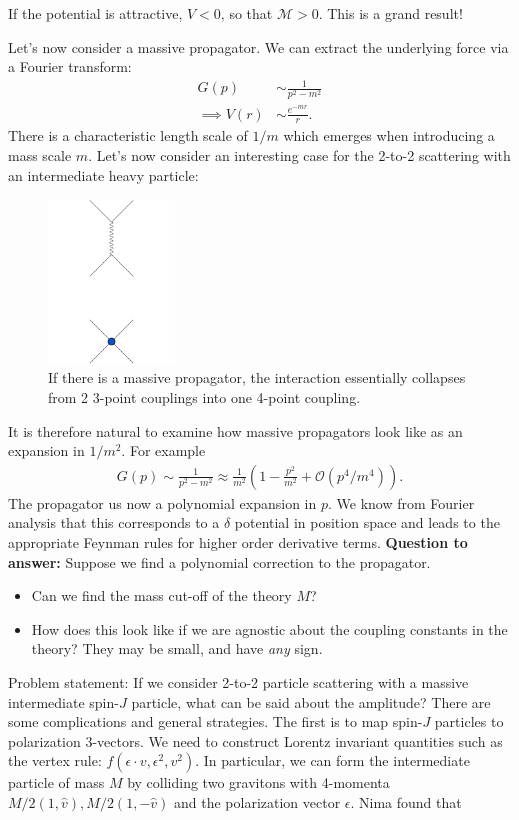 \documentclass[11pt,a4paper]{article}
\begin{document}
If the potential is attractive, $V < 0$, so that $\mathcal{M} > 0$.  This is a grand result!

Let's now consider a massive propagator. We can extract the underlying force via a Fourier transform:
\begin{align*}
G(p) & \sim \frac{1}{p^2 - m^2}\\
\implies V(r) & \sim \frac{e^{- m r}}{r}.
\end{align*}
There is a characteristic length scale of $1/m$ which emerges when introducing a mass scale $m$.  Let's now consider an interesting case for the 2-to-2 scattering with an intermediate heavy particle:
\begin{figure}[ht]
    \centering
    \includegraphics[width=0.3\textwidth]{figures/short_length.pdf}
    \caption{If there is a massive propagator, the interaction essentially collapses from 2 3-point couplings into one 4-point coupling.}
    \label{fig:mesh2}
\end{figure}
It is therefore natural to examine how massive propagators look like as an expansion in $1/m^2$.  For example
\begin{align*}
	G(p) \sim \frac{1}{p^2 - m^2} \approx \frac{1}{m^2}\left(1 - \frac{p^2}{m^2} + \mathcal{O}(p^4/m^4)\right).
\end{align*}
The propagator us now a polynomial expansion in $p$.  We know from Fourier analysis that this corresponds to a $\delta$ potential in position space and leads to the appropriate Feynman rules for higher order derivative terms.
\textbf{Question to answer:} Suppose we find a polynomial correction to the propagator.
\begin{itemize}
	\item Can we find the mass cut-off of the theory $M$?
	\item How does this look like if we are agnostic about the coupling constants in the theory?  They may be small, and have \textit{any} sign.
\end{itemize}
Problem statement:  If we consider 2-to-2 particle scattering with a massive intermediate spin-$J$ particle, what can be said about the amplitude?  There are some complications and general strategies.  The first is to map spin-$J$ particles to polarization 3-vectors.  We need to construct Lorentz invariant quantities such as the vertex rule: $f(\epsilon \cdot v, \epsilon^2, v^2)$. In particular, we can form the intermediate particle of mass $M$ by colliding two gravitons with 4-momenta $M/2 (1,\hat{v}), M/2(1,-\hat{v})$ and the polarization vector $\epsilon$.  Nima found that
\end{document}
